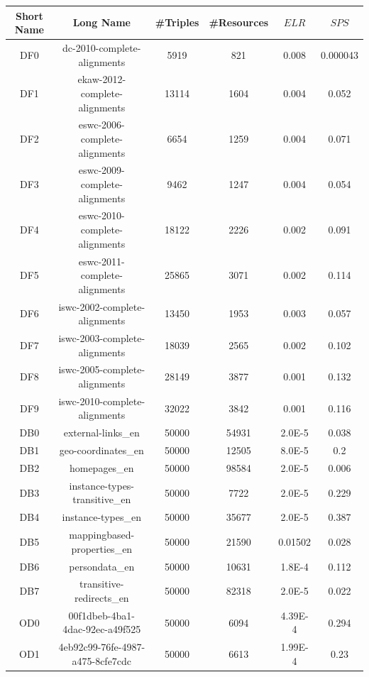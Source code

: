 \begin{center}
	\begin{tabular}{|c|c|c|c|c|c|}
		\hline 
		Short Name & Long Name & \#Triples & \#Resources & $ELR$ & $SPS$ \\ 
		\hline
		DF0 & dc-2010-complete-alignments & 5919 & 821 & 0.008 & 0.000043 \\
		\hline
		DF1 & ekaw-2012-complete-alignments & 13114 & 1604 & 0.004 & 0.052 \\
		\hline
		DF2 & eswc-2006-complete-alignments & 6654 & 1259 & 0.004 & 0.071 \\
		\hline
		DF3 & eswc-2009-complete-alignments & 9462 & 1247 & 0.004 & 0.054 \\
		\hline
		DF4 & eswc-2010-complete-alignments & 18122 & 2226 & 0.002 & 0.091 \\
		\hline
		DF5 & eswc-2011-complete-alignments & 25865 & 3071 & 0.002 & 0.114 \\
		\hline
		DF6 & iswc-2002-complete-alignments & 13450 & 1953 & 0.003 & 0.057 \\
		\hline
		DF7 & iswc-2003-complete-alignments & 18039 & 2565 & 0.002 & 0.102 \\
		\hline
		DF8 & iswc-2005-complete-alignments & 28149 & 3877 & 0.001 & 0.132 \\
		\hline
		DF9 & iswc-2010-complete-alignments & 32022 & 3842 & 0.001 & 0.116 \\
		\hline 
		\hline
		DB0 & external-links\_en & 50000 & 54931 & 2.0E-5 & 0.038 \\
		\hline
		DB1 & geo-coordinates\_en & 50000 & 12505 & 8.0E-5 & 0.2 \\
		\hline
		DB2 & homepages\_en & 50000 & 98584 & 2.0E-5 & 0.006 \\
		\hline
		DB3 & instance-types-transitive\_en & 50000 & 7722 & 2.0E-5 & 0.229 \\
		\hline
		DB4 & instance-types\_en & 50000 & 35677 & 2.0E-5 & 0.387 \\
		\hline
		DB5 & mappingbased-properties\_en & 50000 & 21590 & 0.01502 & 0.028 \\
		\hline
		DB6 & persondata\_en & 50000 & 10631 & 1.8E-4 & 0.112 \\
		\hline
		DB7 & transitive-redirects\_en & 50000 & 82318 & 2.0E-5 & 0.022 \\
		\hline
		\hline
		OD0 & 00f1dbeb-4ba1-4dac-92ec-a49f525 & 50000 & 6094 & 4.39E-4 & 0.294 \\
		\hline
		OD1 & 4eb92c99-76fe-4987-a475-8cfe7cdc & 50000 & 6613 & 1.99E-4 & 0.23 \\

\end{tabular}
\end{center}

